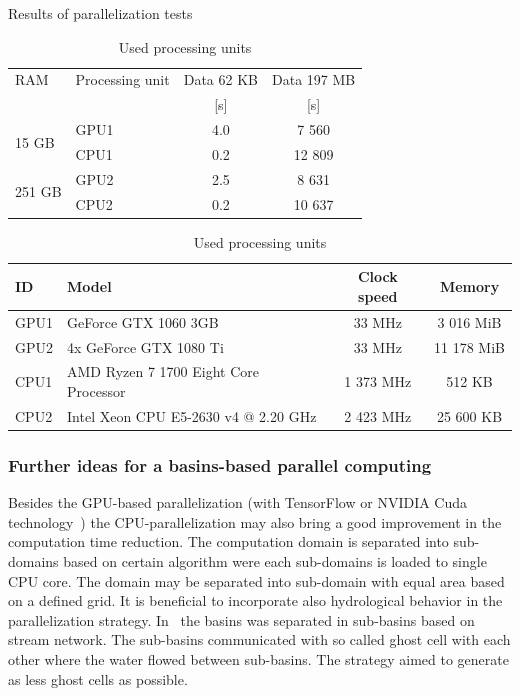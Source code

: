 \begin{table}[h]
  \centering
  \caption{Results of parallelization tests}
  \makegapedcells
  \begin{tabular}{|l|p{2.2cm}|c|c|}\hline
    RAM & Processing unit & Data 62 KB & Data 197 MB\\
     & & [s] & [s]\\\hline
    \multirow{2}{*}{15 GB} & GPU1 & 4.0 & 7 560\\
    & CPU1 & 0.2 & 12 809\\\hline
    \multirow{2}{*}{251 GB} & GPU2 & 2.5 & 8 631\\
    & CPU2 & 0.2 & 10 637\\\hline
  \end{tabular}
  \label{tab:GPU_results}
  \caption{Used processing units}
  \begin{tabular}{|l|p{1.9cm}|c|c|}\hline
    ID & Model & Clock speed & Memory\\\hline
    GPU1 & GeForce GTX 1060 3GB & 33 MHz & 3 016 MiB \\\hline
    GPU2 & 4x GeForce GTX 1080 Ti & 33 MHz & 11 178 MiB \\\hline
    CPU1 & AMD Ryzen 7 1700 Eight Core Processor & 1 373 MHz & 512 KB \\\hline
    CPU2 & Intel Xeon CPU E5-2630 v4 @ 2.20 GHz & 2 423 MHz & 25 600 KB \\\hline
  \end{tabular}
\end{table}

\subsubsection{Further ideas for a basins-based parallel computing}
Besides the GPU-based parallelization (with TensorFlow \cite{tensorflow2015-whitepaper} or
NVIDIA Cuda technology~\cite{Kalyanapu2011,Le2015}) the
CPU-parallelization may also bring a good improvement in the computation
time reduction. The computation domain is separated into sub-domains
based on certain algorithm were each sub-domains is loaded to single
CPU core. The domain may be separated into sub-domain with equal area
based on a defined grid. It is beneficial to incorporate also
hydrological behavior in the parallelization
strategy. In~\cite{Vivoni2011} the basins was separated in sub-basins
based on stream network. The sub-basins communicated with so called
ghost cell with each other where the water flowed between
sub-basins. The strategy aimed to generate as less ghost cells as
possible.

